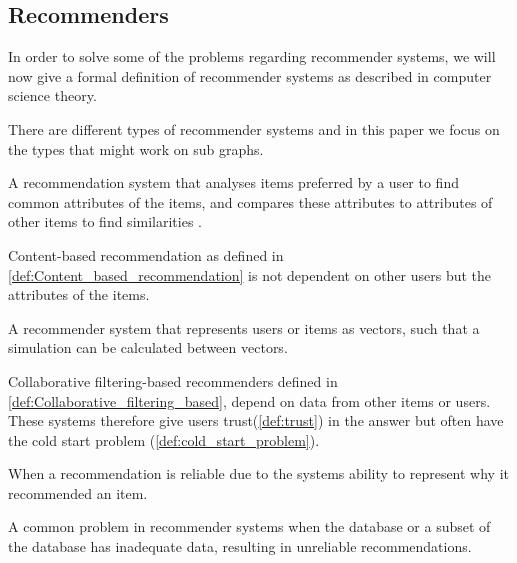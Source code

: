 \subsection{Recommenders}
In order to solve some of the problems regarding recommender systems, we will now give a formal definition of recommender systems as described in computer science theory. 

There are different types of recommender systems and in this paper we focus on the types that might work on sub graphs.

\begin{definition} \label{def:Content_based_recommendation}
A recommendation system that analyses items preferred by a user to find common attributes of the items, and compares these attributes to attributes of other items to find similarities \cite{lu2015recommender}. 
\end{definition}

Content-based recommendation as defined in  \autoref{def:Content_based_recommendation} is not dependent on other users but the attributes of the items.

\begin{definition}\label{def:Collaborative_filtering_based}
A recommender system that represents users or items as vectors, such that a simulation can be calculated between vectors\cite{lu2015recommender}.
\end{definition}

Collaborative filtering-based recommenders defined in \autoref{def:Collaborative_filtering_based}, depend on data from other items or users. These systems therefore give users trust(\autoref{def:trust}) in the answer but often have the cold start problem (\autoref{def:cold_start_problem}).

\begin{definition}[Trust]\label{def:trust}
When a recommendation is reliable due to the systems ability to represent why it recommended an item\cite{Ricci2015}.
\end{definition}

\begin{definition}\label{def:cold_start_problem}
A common problem in recommender systems when the database or a subset of the database has inadequate data, resulting in unreliable recommendations\cite{Ricci2015}.
\end{definition}
